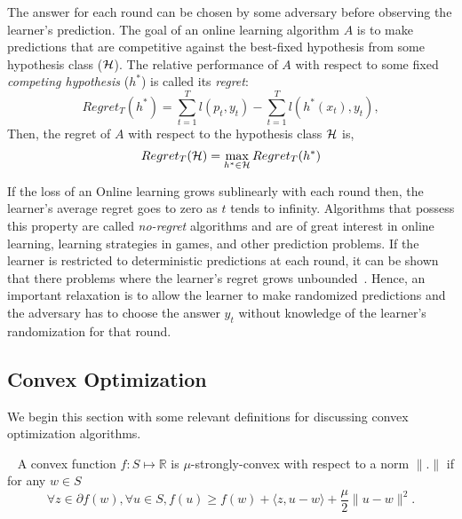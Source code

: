 The answer for each round can be chosen by some
adversary before observing the learner's prediction.
The goal of an online learning algorithm $A$ is to make predictions that are competitive against
the best-fixed hypothesis from some hypothesis class ($\mathcal{H}$).
The relative performance of $A$ with respect to some fixed \textit{competing hypothesis} ($h^\ast$)
is called its \textit{regret}:
\begin{equation}
	\label{eqn:regret} Regret_T(h^*) = \sum_{t=1}^T
	l(p_t, y_t) - \sum_{t=1}^T l(h^*(x_t), y_t),
\end{equation} Then, the regret of $A$ with respect to
the hypothesis class $\mathcal{H}$ is,
\begin{equation}
	\label{eqn:regret_all} Regret_T(\mathcal{H}) =
	\max_{h^* \in \mathcal{H}} Regret_T(h^*)
\end{equation}

If the loss of an Online
learning grows sublinearly with each round then, the learner's average regret goes to zero as $t$
tends to infinity.
Algorithms that possess this property are called \textit{no-regret} algorithms and are of great
interest in online learning, learning strategies in games, and other prediction problems.
If the learner is restricted to deterministic predictions at each round, it can be shown that there
problems where the learner's regret grows unbounded~\cite{coverBehavior1965}.
Hence, an important relaxation is to allow the learner to make randomized predictions and the adversary has to choose the answer $y_t$ without knowledge of the learner's randomization for that
round.

\subsection{Convex Optimization}

We begin this section with some relevant definitions for discussing convex optimization algorithms.

\begin{definition}
	~\label{def:strconvex}
	A convex function $f: S \mapsto \mathbb{R}$ is $\mu$-strongly-convex with respect to a norm $\|.\|$ if for any $w \in S$
	\begin{equation}
		\forall z \in \partial f(w), \forall u \in S, f(u) \geq f(w) + \langle z, u - w\rangle + \frac{\mu}{2}\| u - w \|^2.
	\end{equation}
\end{definition}


